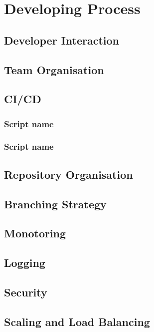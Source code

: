 \chapter{Developing Process}

\section{Developer Interaction}

\section{Team Organisation}

\section{CI/CD}

\subsection{Script name}
\subsection{Script name}

\section{Repository Organisation}

\section{Branching Strategy}

\section{Monotoring}

\section{Logging}

\section{Security}

\section{Scaling and Load Balancing}